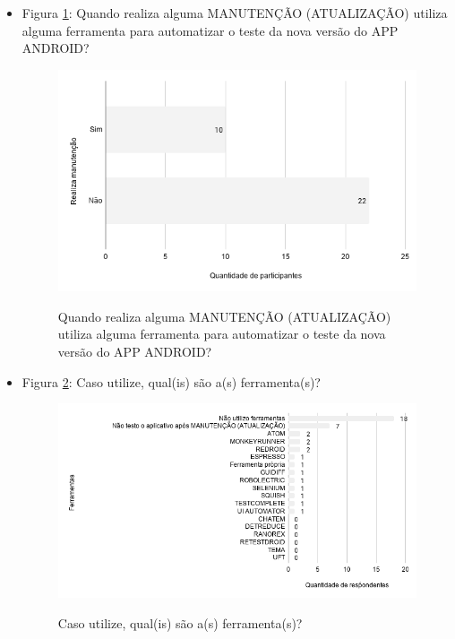 \begin{itemize}
    
    \item Figura \ref{figure:s_testenovo}: Quando realiza alguma MANUTENÇÃO (ATUALIZAÇÃO) utiliza alguma ferramenta para automatizar o teste da nova versão do APP ANDROID?
        \begin{figure}[!htb]
        \centering
        \includegraphics[width=.80\textwidth]{images/s_testenovo.png}
        \label{figure:s_testenovo}
        \caption{Quando realiza alguma MANUTENÇÃO (ATUALIZAÇÃO) utiliza alguma ferramenta para automatizar o teste da nova versão do APP ANDROID?}
        \end{figure}
    
    
    \item Figura \ref{figure:s_ferramentastestenovo}: Caso utilize, qual(is) são a(s) ferramenta(s)?
        \begin{figure}[!htb]
        \centering
        \includegraphics[width=.80\textwidth]{images/s_ferramentastestenovo.png}
        \label{figure:s_ferramentastestenovo}
        \caption{Caso utilize, qual(is) são a(s) ferramenta(s)?}
        \end{figure}
    

\end{itemize}
